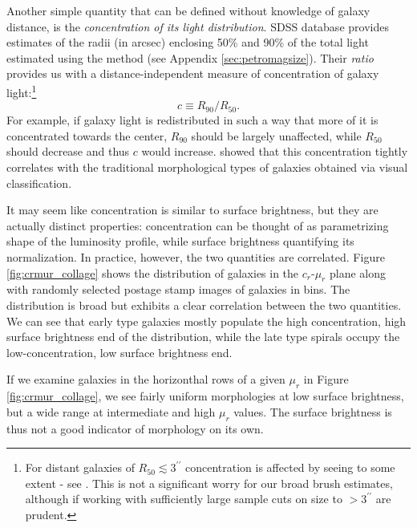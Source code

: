 Another simple quantity that can be defined without knowledge of galaxy distance, is the {\it concentration of its light distribution}. SDSS database provides estimates of the radii (in arcsec) enclosing 50\% and 90\% of the total light estimated using the  \href{http://adsabs.harvard.edu/cgi-bin/nph-bib_query?bibcode=1976ApJ...209L...1P}{\citet{petrosian76}} method (see Appendix \ref{sec:petromagsize}). Their {\it ratio\/} provides us with a distance-independent measure of  concentration of galaxy light:\footnote{For distant galaxies of $R_{50}\lesssim 3^{\prime\prime}$ concentration is affected by seeing to some extent - see \href{http://adsabs.harvard.edu/abs/2003ApJ...594..186B}{\citet{blanton_etal03}}. This is not a significant worry for our broad brush estimates, although if working with sufficiently large sample cuts on size to $>3^{\prime\prime}$ are prudent.}
\begin{equation}
c\equiv R_{90}/R_{50}.
\label{eq:cpetr}
\end{equation}
 For example, if galaxy light is redistributed in such a way that more of it is concentrated towards the center, $R_{90}$ should be largely unaffected, while $R_{50}$ should decrease and thus $c$ would increase.
 \href{http://adsabs.harvard.edu/abs/2001AJ....122.1861S}{\citet{strateva_etal01}} showed that this concentration tightly correlates with the traditional morphological types of galaxies obtained via visual classification. 

It may seem like concentration is similar to surface brightness, but they are actually distinct properties: 
concentration can be thought of as parametrizing shape of the luminosity profile, while surface brightness quantifying its normalization. In practice, however, the two quantities are correlated. 
Figure \ref{fig:crmur_collage} shows the distribution of galaxies in the $c_r$-$\mu_r$ plane along with randomly selected postage stamp images of galaxies in bins. The distribution is broad but exhibits a clear correlation between the two quantities. We can see that early type galaxies mostly populate the high concentration, high surface brightness end of the distribution, while the late type spirals occupy the low-concentration, low surface brightness end. 

If we examine galaxies in the horizonthal rows of a given $\mu_r$ in Figure \ref{fig:crmur_collage}, we see  fairly uniform morphologies at low surface brightness, but a wide range at intermediate and high $\mu_r$ values. The surface brightness is thus not a good indicator of morphology on its own. 

